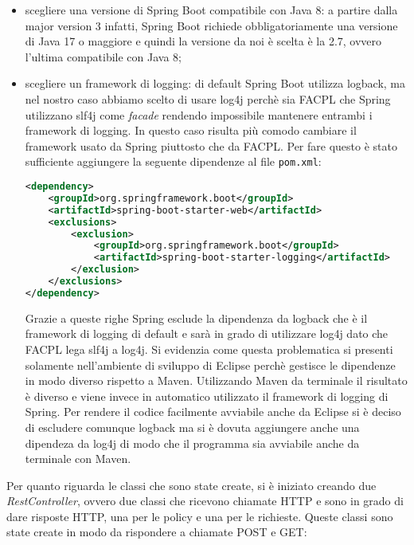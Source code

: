 \begin{itemize}
    \item scegliere una versione di Spring Boot compatibile con Java 8: a partire dalla major version 3 infatti, Spring Boot richiede obbligatoriamente una versione di Java 17 o maggiore e quindi la versione da noi è scelta è la 2.7, ovvero l'ultima compatibile con Java 8;
    \item scegliere un framework di logging: di default Spring Boot utilizza logback, ma nel nostro caso abbiamo scelto di usare log4j perchè sia FACPL che Spring utilizzano slf4j come \emph{facade} rendendo impossibile mantenere entrambi i framework di logging. In questo caso risulta più comodo cambiare il framework usato da Spring piuttosto che da FACPL. Per fare questo è stato sufficiente aggiungere la seguente dipendenze al file \texttt{pom.xml}:
    \begin{lstlisting}[language=XML, xleftmargin=1em, caption=Esclusione di logback, label=code:noLogback]
<dependency>
    <groupId>org.springframework.boot</groupId>
    <artifactId>spring-boot-starter-web</artifactId>
    <exclusions>
        <exclusion>
            <groupId>org.springframework.boot</groupId>
            <artifactId>spring-boot-starter-logging</artifactId>
        </exclusion>
    </exclusions>
</dependency>
    \end{lstlisting}
    Grazie a queste righe Spring esclude la dipendenza da logback che è il framework di logging di default e sarà in grado di utilizzare log4j dato che FACPL lega slf4j a log4j. Si evidenzia come questa problematica si presenti solamente nell'ambiente di sviluppo di Eclipse perchè gestisce le dipendenze in modo diverso rispetto a Maven. Utilizzando Maven da terminale il risultato è diverso e viene invece in automatico utilizzato il framework di logging di Spring. Per rendere il codice facilmente avviabile anche da Eclipse si è deciso di escludere comunque logback ma si è dovuta aggiungere anche una dipendeza da log4j di modo che il programma sia avviabile anche da terminale con Maven.
\end{itemize}
Per quanto riguarda le classi che sono state create, si è iniziato creando due \emph{RestController}, ovvero due classi che ricevono chiamate HTTP e sono in grado di dare risposte HTTP, una per le policy e una per le richieste. Queste classi sono state create in modo da rispondere a chiamate POST e GET:
